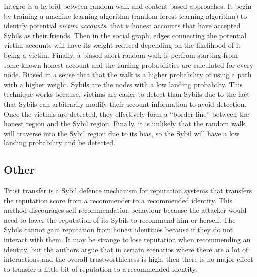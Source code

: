 Integro\cite{boshmaf2015integro} is a hybrid between random walk and content based
approaches. It begin by training a machine learning algorithm (random forest
learning algorithm) to identify potential \emph{victim accounts}, that is honest
accounts that have accepted Sybils as their friends. Then in the social graph,
edges connecting the potential victim accounts will have its weight reduced
depending on the likelihood of it being a victim. Finally, a biased short random
walk is perfrom starting from some known honest account and the landing
probabilities are calculated for every node. Biased in a sense that that the
walk is a higher probability of using a path with a higher weight. Sybils are
the nodes with a low landing probabilty. This technique works because, victims
are easier to detect than Sybils due to the fact that Sybils can arbitrarily
modify their account information to avoid detection. Once the victims are
detected, they effectively form a ``border-line'' between the honest region and
the Sybil region. Finally, it is unlikely that the random walk will traverse
into the Sybil region due to its bias, so the Sybil will have a low landing
probability and be detected.


\subsection{Other}
Trust transfer\cite{seigneur2005trust} is a Sybil defence mechanism for
reputation systems that transfers the reputation score from a recommender to a
recommended identity. This method discourages self-recommendation behaviour
because the attacker would need to lower the reputation of its Sybils to
recommend him or herself. The Sybils cannot gain reputation from honest
identities because if they do not interact with them. It may be strange to lose
reputation when recommending an identity, but the authors argue that in certain
scenarios where there are a lot of interactions and the overall trustworthieness
is high, then there is no major effect to transfer a little bit of reputation to
a recommended identity.

